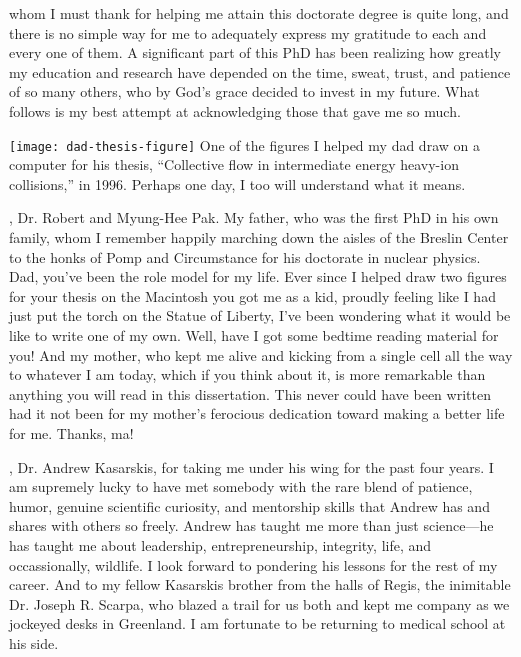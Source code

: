 

 whom I must thank for helping me attain this doctorate degree is quite long, and there is no simple way for me to adequately express my gratitude to each and every one of them. A significant part of this PhD has been realizing how greatly my education and research have depended on the time, sweat, trust, and patience of so many others, who by God's grace decided to invest in my future. What follows is my best attempt at acknowledging those that gave me so much.

\begin{marginfigure}
  \texttt{[image: dad-thesis-figure]}               
  One of the figures I helped my dad draw on a computer for his thesis, ``Collective flow in intermediate energy heavy-ion collisions,'' in 1996. Perhaps one day, I too will understand what it means.
\end{marginfigure}

, Dr. Robert and Myung-Hee Pak. My father, who was the first PhD in his own family, whom I remember happily marching down the aisles of the Breslin Center to the honks of Pomp and Circumstance for his doctorate in nuclear physics. Dad, you've been the role model for my life. Ever since I helped draw two figures for your thesis on the Macintosh you got me as a kid, proudly feeling like I had just put the torch on the Statue of Liberty, I've been wondering what it would be like to write one of my own. Well, have I got some bedtime reading material for you! And my mother, who kept me alive and kicking from a single cell all the way to whatever I am today, which if you think about it, is more remarkable than anything you will read in this dissertation. This never could have been written had it not been for my mother's ferocious dedication toward making a better life for me. Thanks, ma!

, Dr. Andrew Kasarskis, for taking me under his wing for the past four years. I am supremely lucky to have met somebody with the rare blend of patience, humor, genuine scientific curiosity, and mentorship skills that Andrew has and shares with others so freely. Andrew has taught me more than just science—he has taught me about leadership, entrepreneurship, integrity, life, and occassionally, wildlife. I look forward to pondering his lessons for the rest of my career. And to my fellow Kasarskis brother from the halls of Regis, the inimitable Dr. Joseph R. Scarpa, who blazed a trail for us both and kept me company as we jockeyed desks in Greenland. I am fortunate to be returning to medical school at his side.

